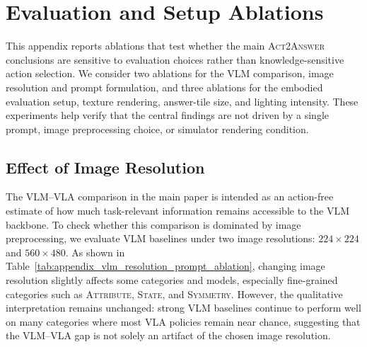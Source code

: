 \documentclass{llmxive}
\begin{document}




\appendix

\label{sec:appendix}

\section{Evaluation and Setup Ablations}
\label{sec:appendix_eval_setup_ablations}

This appendix reports ablations that test whether the main \textsc{Act2Answer} conclusions are sensitive to evaluation choices rather than knowledge-sensitive action selection.
We consider two ablations for the VLM comparison, image resolution and prompt formulation, and three ablations for the embodied evaluation setup, texture rendering, answer-tile size, and lighting intensity. These experiments help verify that the central findings are not driven by a single prompt, image preprocessing choice, or simulator rendering condition.

\subsection{Effect of Image Resolution}

The VLM--VLA comparison in the main paper is intended as an action-free estimate of how much task-relevant information remains accessible to the VLM backbone.
To check whether this comparison is dominated by image preprocessing, we evaluate VLM baselines under two image resolutions: $224 \times 224$ and $560 \times 480$.
As shown in Table~\ref{tab:appendix_vlm_resolution_prompt_ablation}, changing image resolution slightly affects some categories and models, especially fine-grained categories such as \textsc{Attribute}, \textsc{State}, and \textsc{Symmetry}.
However, the qualitative interpretation remains unchanged: strong VLM baselines continue to perform well on many categories where most VLA policies remain near chance, suggesting that the VLM--VLA gap is not solely an artifact of the chosen image resolution.
\end{document}
